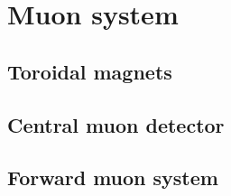 
\section{Muon system}
\subsection{Toroidal magnets}
\subsection{Central muon detector}
\subsection{Forward muon system}
